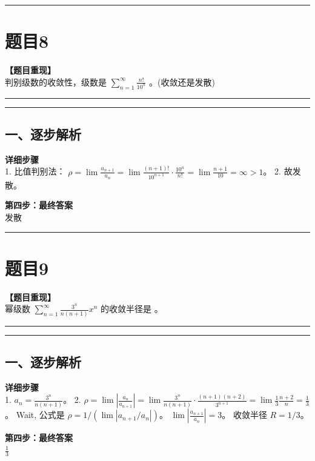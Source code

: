 \documentclass[12pt, a4paper]{ctexart}
\newcommand{\TopSeparator}{
    \par\noindent\rule{\textwidth}{1.5pt}\vspace{0.5em} %
}
\newcommand{\AnalysisSeparator}{
    \par\noindent\rule{\textwidth}{0.5pt}\vspace{0.2em}\hrule\vspace{0.5em} %
}
\newenvironment{RedAnalysis}{
    \par
    \color{red} %
}{
    \par
    \color{black} %
}
\begin{document}
\vspace{2em}

\TopSeparator
\section*{题目8}

\textbf{【题目重现】} \\
判别级数的收敛性，级数是 $ \sum_{n=1}^{\infty}\frac{n!}{10^{n}} $ \underline{\hspace{2cm}}。(收敛还是发散)

\AnalysisSeparator

\begin{RedAnalysis}

\subsection*{一、逐步解析}

\textbf{详细步骤} \\
1. 比值判别法：
   $\rho = \lim \frac{u_{n+1}}{u_n} = \lim \frac{(n+1)!}{10^{n+1}} \cdot \frac{10^n}{n!} = \lim \frac{n+1}{10} = \infty > 1$。
2. 故发散。

\textbf{第四步：最终答案} \\
发散

\end{RedAnalysis}

\vspace{2em}

\TopSeparator
\section*{题目9}

\textbf{【题目重现】} \\
幂级数 $ \sum_{n=1}^{\infty}\frac{3^{n}}{n(n+1)}x^{n} $ 的收敛半径是 \underline{\hspace{2cm}}。

\AnalysisSeparator

\begin{RedAnalysis}

\subsection*{一、逐步解析}

\textbf{详细步骤} \\
1. $a_n = \frac{3^n}{n(n+1)}$。
2. $\rho = \lim |\frac{a_n}{a_{n+1}}| = \lim \frac{3^n}{n(n+1)} \cdot \frac{(n+1)(n+2)}{3^{n+1}} = \lim \frac{1}{3} \frac{n+2}{n} = \frac{1}{3}$。
   Wait, 公式是 $\rho = 1 / (\lim |a_{n+1}/a_n|)$。
   $\lim |\frac{a_{n+1}}{a_n}| = 3$。
   收敛半径 $R = 1/3$。

\textbf{第四步：最终答案} \\
$ \frac{1}{3} $

\end{RedAnalysis}
\end{document}
